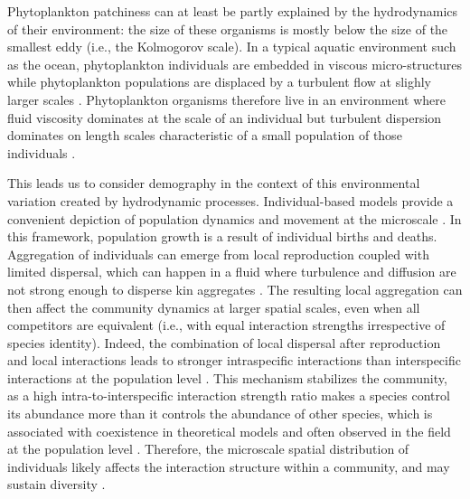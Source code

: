 \documentclass[12pt,english]{article}
\begin{document}
Phytoplankton patchiness can at least be partly explained by the hydrodynamics
of their environment: the size of these organisms is mostly below
the size of the smallest eddy (i.e., the Kolmogorov scale). In a typical
aquatic environment such as the ocean, phytoplankton individuals are
embedded in viscous micro-structures \citep{peters_effects_2000}
while phytoplankton populations are displaced by a turbulent flow
at slighly larger scales \citep{martin_phytoplankton_2003,prairie_biophysical_2012}.
Phytoplankton organisms therefore live in an environment where fluid
viscosity dominates at the scale of an individual but turbulent dispersion
dominates on length scales characteristic of a small population of
those individuals \citep{estrada_effects_1987,prairie_biophysical_2012}.

This leads us to consider demography in the context of this environmental
variation created by hydrodynamic processes. Individual-based models
provide a convenient depiction of population dynamics and movement
at the microscale \citep{hellweger_bunch_2009}. In this framework,
population growth is a result of individual births and deaths. Aggregation
of individuals can emerge from local reproduction coupled with limited
dispersal, which can happen in a fluid where turbulence and diffusion
are not strong enough to disperse kin aggregates \citep{young_reproductive_2001}.
The resulting local aggregation can then affect the community dynamics
at larger spatial scales, even when all competitors are equivalent
(i.e., with equal interaction strengths irrespective of species identity).
Indeed, the combination of local dispersal after reproduction and
local interactions leads to stronger intraspecific interactions than
interspecific interactions at the population level \citep{detto_stabilization_2016}.
This mechanism stabilizes the community, as a high intra-to-interspecific
interaction strength ratio makes a species control its abundance more
than it controls the abundance of other species, which is associated
with coexistence in theoretical models \citep{levine_importance_2009,barabas_self-regulation_2017}
and often observed in the field at the population level \citep{adler_competition_2018,picoche_strong_2020}.
Therefore, the microscale spatial distribution of individuals likely
affects the interaction structure within a community,
and may sustain diversity \citep{haegeman_how_2008}.
\end{document}

